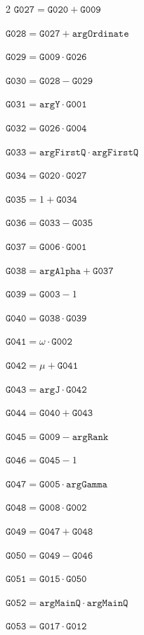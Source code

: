 \documentclass[10pt]{article}
\begin{document}
\begin{multicols}{2}
\noindent $\mathtt{G027}=\mathtt{G020}+\mathtt{G009}$\par
\noindent $\mathtt{G028}=\mathtt{G027}+\mathtt{argOrdinate}$\par
\noindent $\mathtt{G029}=\mathtt{G009}\cdot \mathtt{G026}$\par
\noindent $\mathtt{G030}=\mathtt{G028}-\mathtt{G029}$\par
\noindent $\mathtt{G031}=\mathtt{argY}\cdot \mathtt{G001}$\par
\noindent $\mathtt{G032}=\mathtt{G026}\cdot \mathtt{G004}$\par
\noindent $\mathtt{G033}=\mathtt{argFirstQ}\cdot \mathtt{argFirstQ}$\par
\noindent $\mathtt{G034}=\mathtt{G020}\cdot \mathtt{G027}$\par
\noindent $\mathtt{G035}=1+\mathtt{G034}$\par
\noindent $\mathtt{G036}=\mathtt{G033}-\mathtt{G035}$\par
\noindent $\mathtt{G037}=\mathtt{G006}\cdot \mathtt{G001}$\par
\noindent $\mathtt{G038}=\mathtt{argAlpha}+\mathtt{G037}$\par
\noindent $\mathtt{G039}=\mathtt{G003}-1$\par
\noindent $\mathtt{G040}=\mathtt{G038}\cdot \mathtt{G039}$\par
\noindent $\mathtt{G041}=\omega\cdot \mathtt{G002}$\par
\noindent $\mathtt{G042}=\mu+\mathtt{G041}$\par
\noindent $\mathtt{G043}=\mathtt{argJ}\cdot \mathtt{G042}$\par
\noindent $\mathtt{G044}=\mathtt{G040}+\mathtt{G043}$\par
\noindent $\mathtt{G045}=\mathtt{G009}-\mathtt{argRank}$\par
\noindent $\mathtt{G046}=\mathtt{G045}-1$\par
\noindent $\mathtt{G047}=\mathtt{G005}\cdot \mathtt{argGamma}$\par
\noindent $\mathtt{G048}=\mathtt{G008}\cdot \mathtt{G002}$\par
\noindent $\mathtt{G049}=\mathtt{G047}+\mathtt{G048}$\par
\noindent $\mathtt{G050}=\mathtt{G049}-\mathtt{G046}$\par
\noindent $\mathtt{G051}=\mathtt{G015}\cdot \mathtt{G050}$\par
\noindent $\mathtt{G052}=\mathtt{argMainQ}\cdot \mathtt{argMainQ}$\par
\noindent $\mathtt{G053}=\mathtt{G017}\cdot \mathtt{G012}$\par

\end{multicols}
\end{document}
